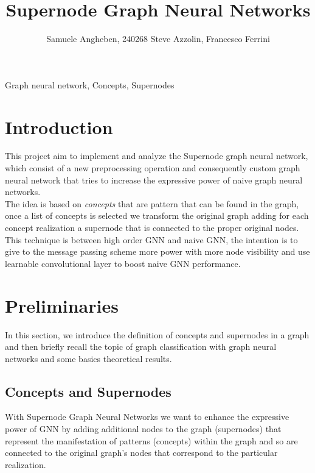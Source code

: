 \documentclass[twoside,11pt]{article}
\begin{document}
\title{Supernode Graph Neural Networks}

\author{\name Samuele Angheben, 240268
        \AND
       \name Steve Azzolin, Francesco Ferrini
   }

\maketitle

%

\begin{keywords}
  Graph neural network, Concepts, Supernodes
\end{keywords}

\section{Introduction}
This project aim to implement and analyze the Supernode graph neural network, which consist of a new preprocessing operation and consequently custom graph neural network that tries to increase the expressive power of naive graph neural networks.\\
The idea is based on \textit{concepts} that are pattern that can be found in the graph, once a list of concepts is selected we transform the original graph adding for each concept realization a supernode that is connected to the proper original nodes.\\
This technique is between high order GNN and naive GNN, the intention is to give to the message passing scheme more power with more node visibility and use learnable convolutional layer to boost naive GNN performance.



\section{Preliminaries} %
\label{sec:preliminaries}
In this section, we introduce the definition of concepts and supernodes in a graph and then briefly recall the topic of graph classification with graph neural networks and some basics theoretical results.

\subsection{Concepts and Supernodes} %
\label{sub:concepts_and_supernodes}
With Supernode Graph Neural Networks we want to enhance the expressive power of GNN by adding additional nodes to the graph (supernodes) that represent the manifestation of patterns (concepts) within the graph and so are connected to the original graph's nodes that correspond to the particular realization.\\
\end{document}
